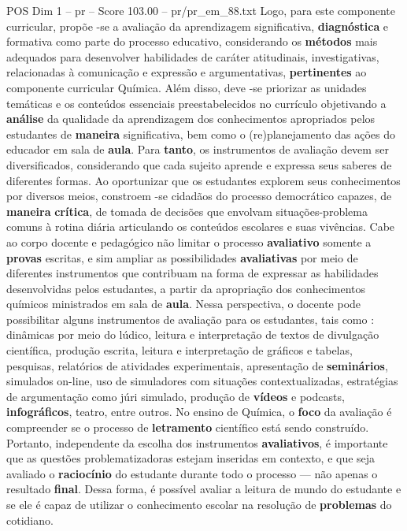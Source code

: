 \begin{textsample}{POS Dim 1 – pr – Score 103.00 – pr/pr\_em\_88.txt}
Logo, para este componente curricular, propõe -se a avaliação da aprendizagem significativa, \textbf{diagnóstica} e formativa como parte do processo educativo, considerando os \textbf{métodos} mais adequados para desenvolver habilidades de caráter atitudinais, investigativas, relacionadas à comunicação e expressão e argumentativas, \textbf{pertinentes} ao componente curricular Química.
Além disso, deve -se priorizar as unidades temáticas e os conteúdos essenciais preestabelecidos no currículo objetivando a \textbf{análise} da qualidade da aprendizagem dos conhecimentos apropriados pelos estudantes de \textbf{maneira} significativa, bem como o (re)planejamento das ações do educador em sala de \textbf{aula}.
Para \textbf{tanto}, os instrumentos de avaliação devem ser diversificados, considerando que cada sujeito aprende e expressa seus saberes de diferentes formas.
Ao oportunizar que os estudantes explorem seus conhecimentos por diversos meios, constroem -se cidadãos do processo democrático capazes, de \textbf{maneira} \textbf{crítica}, de tomada de decisões que envolvam situações-problema comuns à rotina diária articulando os conteúdos escolares e suas vivências.
Cabe ao corpo docente e pedagógico não limitar o processo \textbf{avaliativo} somente a \textbf{provas} escritas, e sim ampliar as possibilidades \textbf{avaliativas} por meio de diferentes instrumentos que contribuam na forma de expressar as habilidades desenvolvidas pelos estudantes, a partir da apropriação dos conhecimentos químicos ministrados em sala de \textbf{aula}.
Nessa perspectiva, o docente pode possibilitar alguns instrumentos de avaliação para os estudantes, tais como : dinâmicas por meio do lúdico, leitura e interpretação de textos de divulgação científica, produção escrita, leitura e interpretação de gráficos e tabelas, pesquisas, relatórios de atividades experimentais, apresentação de \textbf{seminários}, simulados on-line, uso de simuladores com situações contextualizadas, estratégias de argumentação como júri simulado, produção de \textbf{vídeos} e podcasts, \textbf{infográficos}, teatro, entre outros.
No ensino de Química, o \textbf{foco} da avaliação é compreender se o processo de \textbf{letramento} científico está sendo construído.
Portanto, independente da escolha dos instrumentos \textbf{avaliativos}, é importante que as questões problematizadoras estejam inseridas em contexto, e que seja avaliado o \textbf{raciocínio} do estudante durante todo o processo — não apenas o resultado \textbf{final}.
Dessa forma, é possível avaliar a leitura de mundo do estudante e se ele é capaz de utilizar o conhecimento escolar na resolução de \textbf{problemas} do cotidiano.

\end{textsample}
